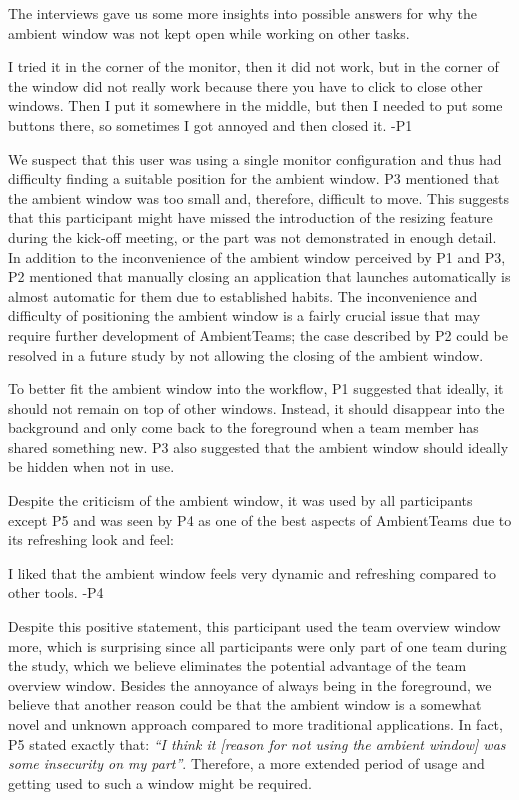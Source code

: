 The interviews gave us some more insights into possible answers for why the ambient window was not kept open while working on other tasks.

\begin{displayquote}
    I tried it in the corner of the monitor, then it did not work, but in the corner of the window did not really work because there you have to click to close other windows. Then I put it somewhere in the middle, but then I needed to put some buttons there, so sometimes I got annoyed and then closed it. -P1
\end{displayquote}

We suspect that this user was using a single monitor configuration and thus had difficulty finding a suitable position for the ambient window. P3 mentioned that the ambient window was too small and, therefore, difficult to move. This suggests that this participant might have missed the introduction of the resizing feature during the kick-off meeting, or the part was not demonstrated in enough detail. In addition to the inconvenience of the ambient window perceived by P1 and P3, P2 mentioned that manually closing an application that launches automatically is almost automatic for them due to established habits. The inconvenience and difficulty of positioning the ambient window is a fairly crucial issue that may require further development of AmbientTeams; the case described by P2 could be resolved in a future study by not allowing the closing of the ambient window.

To better fit the ambient window into the workflow, P1 suggested that ideally, it should not remain on top of other windows. Instead, it should disappear into the background and only come back to the foreground when a team member has shared something new. P3 also suggested that the ambient window should ideally be hidden when not in use.

Despite the criticism of the ambient window, it was used by all participants except P5 and was seen by P4 as one of the best aspects of AmbientTeams due to its refreshing look and feel:

\begin{displayquote}
    I liked that the ambient window feels very dynamic and refreshing compared to other tools. -P4
\end{displayquote}

Despite this positive statement, this participant used the team overview window more, which is surprising since all participants were only part of one team during the study, which we believe eliminates the potential advantage of the team overview window. Besides the annoyance of always being in the foreground, we believe that another reason could be that the ambient window is a somewhat novel and unknown approach compared to more traditional applications. In fact, P5 stated exactly that: \textit{\enquote{I think it [reason for not using the ambient window] was some insecurity on my part}}. Therefore, a more extended period of usage and getting used to such a window might be required.

